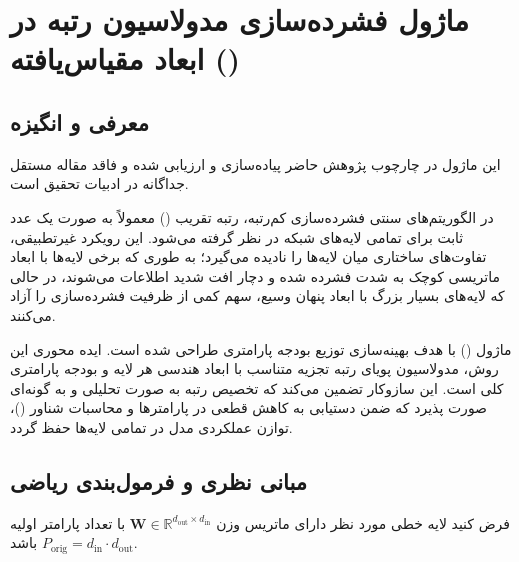 \section{ماژول فشرده‌سازی مدولاسیون رتبه در ابعاد مقیاس‌یافته ()}
\label{sec:sdrm_compressor}

\subsection{معرفی و انگیزه}
این ماژول در چارچوب پژوهش حاضر پیاده‌سازی و ارزیابی شده و فاقد مقاله مستقل جداگانه در ادبیات تحقیق است.

در الگوریتم‌های سنتی فشرده‌سازی کم‌رتبه، رتبه تقریب () معمولاً به صورت یک عدد ثابت برای تمامی لایه‌های شبکه در نظر گرفته می‌شود. این رویکرد غیرتطبیقی، تفاوت‌های ساختاری میان لایه‌ها را نادیده می‌گیرد؛ به طوری که برخی لایه‌ها با ابعاد ماتریسی کوچک به شدت فشرده شده و دچار افت شدید اطلاعات می‌شوند، در حالی که لایه‌های بسیار بزرگ با ابعاد پنهان وسیع، سهم کمی از ظرفیت فشرده‌سازی را آزاد می‌کنند.

ماژول  () با هدف بهینه‌سازی توزیع بودجه پارامتری طراحی شده است. ایده محوری این روش، مدولاسیون پویای رتبه تجزیه متناسب با ابعاد هندسی هر لایه و بودجه پارامتری کلی است. این سازوکار تضمین می‌کند که تخصیص رتبه به صورت تحلیلی و به گونه‌ای صورت پذیرد که ضمن دستیابی به کاهش قطعی در پارامترها و محاسبات شناور ()، توازن عملکردی مدل در تمامی لایه‌ها حفظ گردد.

\subsection{مبانی نظری و فرمول‌بندی ریاضی}
فرض کنید لایه خطی مورد نظر دارای ماتریس وزن $\mathbf{W} \in \mathbb{R}^{d_{\text{out}} \times d_{\text{in}}}$ با تعداد پارامتر اولیه $P_{\text{orig}} = d_{\text{in}} \cdot d_{\text{out}}$ باشد.


